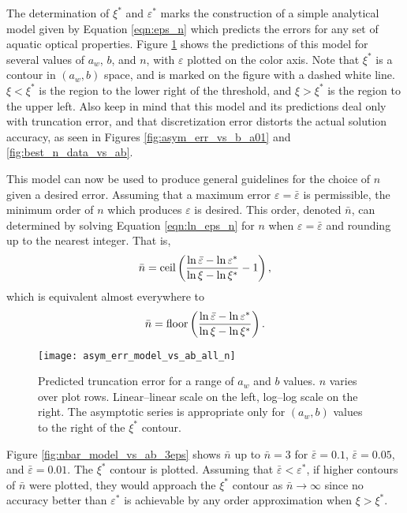 The determination of $\xi^*$ and $\varepsilon^*$ marks the construction of a simple analytical model given by Equation \eqref{eqn:eps_n} which predicts the errors for any set of aquatic optical properties.
Figure \ref{fig:asym_err_model_vs_ab_all_n} shows the predictions of this model for several values of $a_w$, $b$, and $n$, with $\varepsilon$ plotted on the color axis.
Note that $\xi^*$ is a contour in $(a_w, b)$ space, and is marked on the figure with a dashed white line.
$\xi<\xi^*$ is the region to the lower right of the threshold, and $\xi>\xi^*$ is the region to the upper left.
Also keep in mind that this model and its predictions deal only with truncation error, and that discretization error distorts the actual solution accuracy, as seen in Figures \ref{fig:asym_err_vs_b_a01} and \ref{fig:best_n_data_vs_ab}.


This model can now be used to produce general guidelines for the choice of $n$ given a desired error.
Assuming that a maximum error $\varepsilon=\bar\varepsilon$ is permissible, the minimum order of $n$ which produces $\varepsilon$ is desired.
This order, denoted $\bar{n}$, can determined by solving Equation \eqref{eqn:ln_eps_n} for $n$ when $\varepsilon=\bar{\varepsilon}$ and rounding up to the nearest integer.
That is,
\begin{equation*}
  \bar{n} = \mbox{ceil}\left(\frac{\ln\bar{\varepsilon} - \ln\varepsilon^*}{\ln\xi - \ln\xi^*} - 1 \right),
\end{equation*}
which is equivalent almost everywhere to
\begin{equation}
  \label{eqn:n_bar}
  \bar{n} = \mbox{floor}\left(\frac{\ln\bar{\varepsilon} - \ln\varepsilon^*}{\ln\xi - \ln\xi^*}\right).
\end{equation}

\begin{figure}[H]
  \centering
  \texttt{[image: asym\_err\_model\_vs\_ab\_all\_n]}
  \caption{Predicted truncation error for a range of $a_w$ and $b$ values. $n$ varies over plot rows. Linear--linear scale on the left, log--log scale on the right. The asymptotic series is appropriate only for $(a_w,b)$ values to the right of the $\xi^*$ contour.}
  \label{fig:asym_err_model_vs_ab_all_n}
\end{figure}


Figure \ref{fig:nbar_model_vs_ab_3eps} shows $\bar{n}$ up to $\bar{n}=3$ for $\bar{\varepsilon}=0.1$, $\bar{\varepsilon}=0.05$, and $\bar{\varepsilon}=0.01$.
The $\xi^*$ contour is plotted.
Assuming that $\bar{\varepsilon}<\varepsilon^*$, if higher contours of $\bar{n}$ were plotted, they would approach the $\xi^*$ contour as $\bar{n} \to \infty$ since no accuracy better than $\varepsilon^*$ is achievable by any order approximation when $\xi > \xi^*$.


